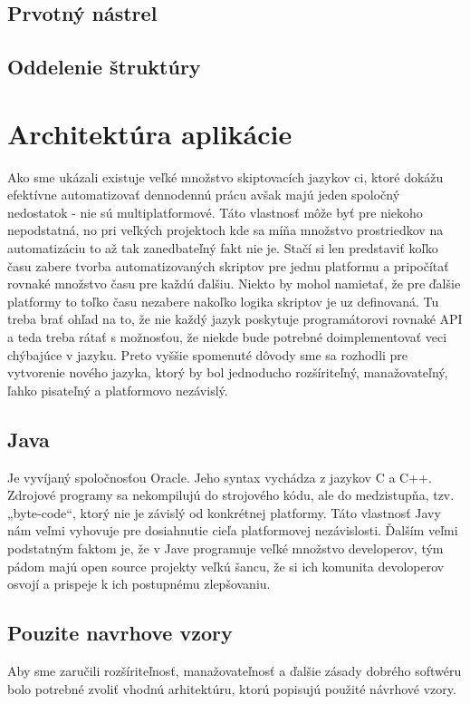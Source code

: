 \subsection{Prvotný nástrel}
\subsection{Oddelenie štruktúry}

\section{Architektúra aplikácie}
\indent Ako sme ukázali existuje veľké množstvo skiptovacích jazykov ci, ktoré dokážu efektívne automatizovať dennodennú prácu avšak majú jeden spoločný nedostatok - nie sú multiplatformové. Táto vlastnosť môže byť  pre niekoho nepodstatná, no pri veľkých projektoch kde sa míňa množstvo prostriedkov na automatizáciu to až tak zanedbateľný fakt nie je. Stačí si len predstaviť koľko času zabere tvorba automatizovaných skriptov pre jednu platformu a pripočítať rovnaké množstvo času pre každú ďalšiu. Niekto by mohol namietať, že pre ďalšie platformy to toľko času nezabere nakoľko logika skriptov je uz definovaná. Tu treba brať ohľad na to, že nie každý jazyk poskytuje programátorovi rovnaké API a teda treba rátať s možnosťou, že niekde bude potrebné doimplementovať veci chýbajúce v jazyku. Preto vyššie spomenuté dôvody sme sa rozhodli pre vytvorenie nového jazyka, ktorý by bol jednoducho rozšíriteľný, manažovateľný, ľahko pisateľný a platformovo nezávislý. \cite{morf}

\subsection{Java}
\indent Je vyvíjaný spoločnosťou Oracle. Jeho syntax vychádza z jazykov C a C++. Zdrojové programy sa nekompilujú do strojového kódu, ale do medzistupňa, tzv. „byte-code“, ktorý nie je závislý od konkrétnej platformy. Táto vlastnosť Javy nám veľmi vyhovuje pre dosiahnutie cieľa platformovej nezávislosti. Ďalším veľmi podstatným faktom je, že v Jave programuje veľké množstvo developerov, tým pádom majú open source projekty veľkú šancu, že si ich komunita devoloperov osvojí a prispeje k ich postupnému zlepšovaniu.

\subsection{Pouzite navrhove vzory}
Aby sme zaručili rozšíriteľnosť, manažovateľnosť a ďalšie zásady dobrého softwéru bolo potrebné zvoliť vhodnú arhitektúru, ktorú popisujú použité návrhové vzory.
